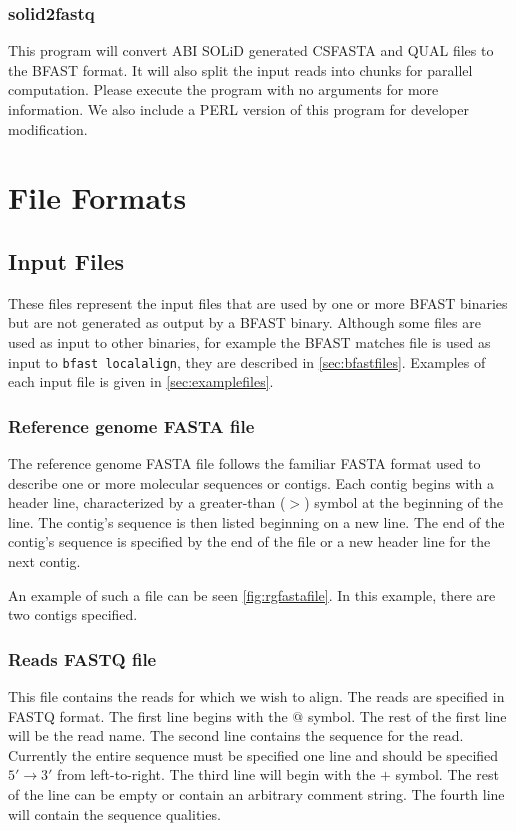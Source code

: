 \documentclass[a4paper,12pt]{book}
\newcommand{\TT}[1]{{\tt #1}} %
\newcommand{\rGFF}{reference genome FASTA file}
\newcommand{\RGFF}{Reference genome FASTA file}
\newcommand{\RFF}{Reads FASTQ file}
\newcommand{\BMF}{BFAST matches file} %
\newcommand{\FIVETOTHREE}{$5'\rightarrow3'$} %
\begin{document}
\subsection{solid2fastq}
This program will convert ABI SOLiD generated CSFASTA and QUAL files to the BFAST format.
It will also split the input reads into chunks for parallel computation.
Please execute the program with no arguments for more information.
We also include a PERL version of this program for developer modification.
\chapter{File Formats}
\section{Input Files}
\label{sec:inputfiles}
These files represent the input files that are used by one or more BFAST binaries but are not generated as output by a BFAST binary.
Although some files are used as input to other binaries, for example the \BMF{} is used as input to \TT{bfast localalign}, they are described in \autoref{sec:bfastfiles}.
Examples of each input file is given in \autoref{sec:examplefiles}.
\subsection{\RGFF{}}
\label{sec:rgfastafile}
The \rGFF{} follows the familiar FASTA format used to describe one or more molecular sequences or contigs.
Each contig begins with a header line, characterized by a greater-than ($>$) symbol at the beginning of the line.
The contig's sequence is then listed beginning on a new line.
The end of the contig's sequence is specified by the end of the file or a new header line for the next contig.

An example of such a file can be seen \autoref{fig:rgfastafile}.
In this example, there are two contigs specified. 

\subsection{\RFF{}}
\label{sec:rff}
This file contains the reads for which we wish to align.
The reads are specified in FASTQ format.
The first line begins with the $@$ symbol.
The rest of the first line will be the read name.
The second line contains the sequence for the read.
Currently the entire sequence must be specified one line and should be specified \FIVETOTHREE{} from left-to-right.
The third line will begin with the $+$ symbol.
The rest of the line can be empty or contain an arbitrary comment string.
The fourth line will contain the sequence qualities.
\end{document}
